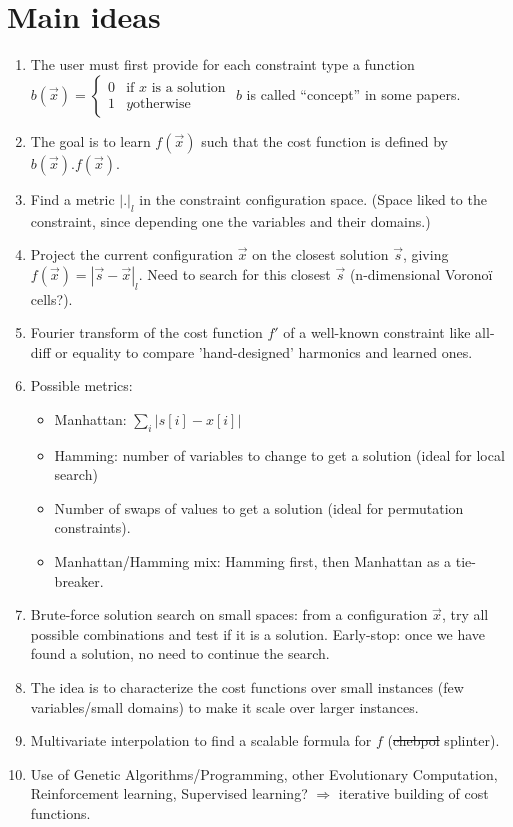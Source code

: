 \documentclass[a4paper, 12pt]{article}
\begin{document}
\section{Main ideas}
\begin{enumerate}
\item The user must first provide for each constraint type a function $b(\vec{x}) = \left\{
  \begin{array}{rl}
    0 & \text{if } x \text{ is a solution}\\
    1 & y\text{otherwise}
  \end{array} \right.$
$b$ is called ``concept'' in some papers.
\item The goal is to learn $f(\vec x)$ such that the cost function is defined by $b(\vec x) . f(\vec x)$.

\item Find a metric $|.|_l$ in the constraint configuration space. (\danger Space liked to the constraint, since depending one the variables and their domains.)
\item Project the current configuration $\vec{x}$ on the closest solution $\vec{s}$, giving $f(\vec x) = |\vec{s}-\vec{x}|_l$. Need to search for this closest $\vec{s}$ (n-dimensional Voronoï cells?).
\item Fourier transform of the cost function $f'$ of a well-known constraint like all-diff or equality to compare 'hand-designed' harmonics and learned ones.
\item Possible metrics:
  \begin{itemize}
  \item Manhattan: $\sum\limits_i |s[i] - x[i]|$
  \item Hamming: number of variables to change to get a solution (ideal for local search)
  \item Number of swaps of values to get a solution (ideal for permutation constraints).
  \item Manhattan/Hamming mix: Hamming first, then Manhattan as a tie-breaker.
  \end{itemize}
\item Brute-force solution search on small spaces: from a configuration $\vec{x}$, try all possible combinations and test if it is a solution. Early-stop: once we have found a solution, no need to continue the search.
\item The idea is to characterize the cost functions over small instances (few variables/small domains) to make it scale over larger instances.
\item Multivariate  interpolation to find  a scalable formula  for $f$
  (\sout{chebpol} splinter).
\item  Use  of   Genetic  Algorithms/Programming,  other  Evolutionary
  Computation,    Reinforcement    learning,   Supervised    learning?
  $\Rightarrow$ iterative building of cost functions.
\end{enumerate}
\end{document}
